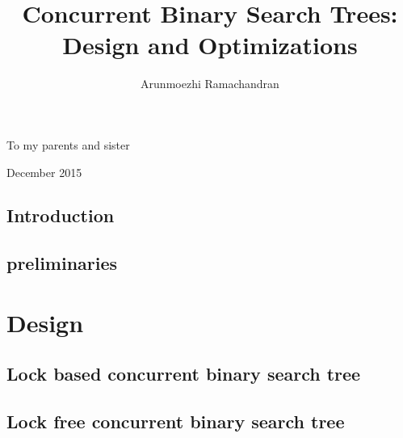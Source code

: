 \documentclass[doublespacing]{utdthesis}
\author{Arunmoezhi Ramachandran}
\title{Concurrent Binary Search Trees: Design and Optimizations}
\newcommand{\preliminaries}{preliminaries}
\begin{document}
\frontmatter

\signaturepage
{} %

\begin{dedication} %
To my parents and sister
\end{dedication}

\maketitle

\begin{acks}{December 2015}

\end{acks}

\begin{preface} %
\prefacetext
\end{preface}

\begin{abstract}

\end{abstract}

\tableofcontents
\listoffigures %
\listoftables %

\mainmatter
\newenvironment{limitscope}{}{}

\chapter{Introduction}
\label{chapter:introduction}


\chapter{\preliminaries}
\label{chapter:\preliminaries}


\part{Design}

\chapter{Lock based concurrent binary search tree}
\label{chapter:castle}


\chapter{Lock free concurrent binary search tree}
\label{chapter:icdcn}

\end{document}
